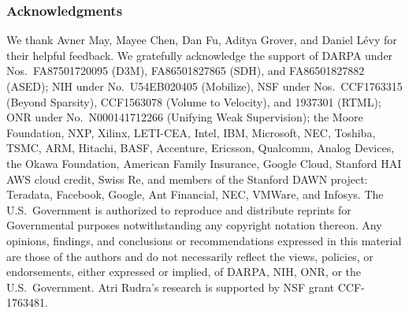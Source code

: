 \documentclass{article}
\begin{document}
 

\subsubsection*{Acknowledgments}

We thank
Avner May, Mayee Chen, Dan Fu,
Aditya Grover,
and Daniel L\'{e}vy
for their helpful feedback.
We gratefully acknowledge the support of DARPA under Nos.\ FA87501720095 (D3M),
FA86501827865 (SDH), and FA86501827882 (ASED); NIH under No.\ U54EB020405
(Mobilize), NSF under Nos.\ CCF1763315 (Beyond Sparsity), CCF1563078 (Volume to
Velocity), and 1937301 (RTML); ONR under No.\ N000141712266 (Unifying Weak
Supervision); the Moore Foundation, NXP, Xilinx, LETI-CEA, Intel, IBM,
Microsoft, NEC, Toshiba, TSMC, ARM, Hitachi, BASF, Accenture, Ericsson,
Qualcomm, Analog Devices, the Okawa Foundation, American Family Insurance,
Google Cloud, Stanford HAI AWS cloud credit, Swiss Re, and members of the Stanford DAWN project: Teradata,
Facebook, Google, Ant Financial, NEC, VMWare, and Infosys.
The U.S.\ Government is authorized to reproduce and distribute reprints for
Governmental purposes notwithstanding any copyright notation thereon.
Any opinions, findings, and conclusions or recommendations expressed in this
material are those of the authors and do not necessarily reflect the views,
policies, or endorsements, either expressed or implied, of DARPA, NIH, ONR, or
the U.S.\ Government.
Atri Rudra’s research is supported by NSF grant CCF-1763481.





\appendix

\newpage













\end{document}
